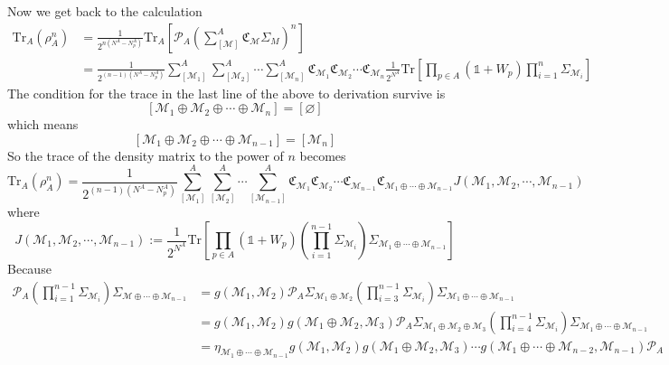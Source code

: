 \documentclass[12font]{article}
\theoremstyle{definition}
\numberwithin{equation}{section}
\newcommand{\lr}[1]{\left(  #1  \right)}
\newcommand{\lrm}[1]{\left[  #1  \right]}
\newcommand{\mrm}[1]{\mathrm{#1}}
\newcommand{\Tr}{\mrm{Tr}}
\begin{document}
Now we get back to the calculation 
\begin{align*}
\Tr_A\lr{\rho_A^n} &= \frac{1}{2^{n(N^A - N_p^A)}}\Tr_A\lrm{\mathcal{P}_A \lr{\sum_{[\mathcal{M}]}^{A}\mathfrak{C}_{\mathcal{M}}\Sigma_M}^n} \\
&= \frac{1}{2^{(n-1)(N^A - N_p^A)}} \sum_{[\mathcal{M}_1]}^{A}\sum_{[\mathcal{M}_2]}^{A} \cdots \sum_{[\mathcal{M}_n]}^{A} \mathfrak{C}_{\mathcal{M}_1}\mathfrak{C}_{\mathcal{M}_2} \cdots \mathfrak{C}_{\mathcal{M}_n}\frac{1}{2^{N^A}}\Tr\lrm{\prod_{p\in A}\lr{\mathds{1} + W_p}\prod_{i=1}^{n}\Sigma_{\mathcal{M}_i}} 
\end{align*}
The condition for the trace in the last line of the above to derivation survive is
\[
[\mathcal{M}_1\oplus\mathcal{M}_2\oplus\cdots\oplus \mathcal{M}_n] = [\varnothing]
\]
which means
\[
[\mathcal{M}_1\oplus\mathcal{M}_2\oplus\cdots\oplus \mathcal{M}_{n-1}] = [\mathcal{M}_n]
\]
So the trace of the density matrix to the power of $n$ becomes
\begin{equation}\label{rho_derive_1.e}
\Tr_A\lr{\rho_A^n} = \frac{1}{2^{(n-1)(N^A - N_p^A)}} \sum_{[\mathcal{M}_1]}^{A}\sum_{[\mathcal{M}_2]}^{A} \cdots \sum_{[\mathcal{M}_{n-1}]}^{A} \mathfrak{C}_{\mathcal{M}_1}\mathfrak{C}_{\mathcal{M}_2} \cdots \mathfrak{C}_{\mathcal{M}_{n-1}} \mathfrak{C}_{\mathcal{M}_1\oplus\cdots\oplus\mathcal{M}_{n-1}} J\lr{\mathcal{M}_1,\mathcal{M}_2,\cdots,\mathcal{M}_{n-1}}
\end{equation}
where
\[
  J\lr{\mathcal{M}_1,\mathcal{M}_2,\cdots,\mathcal{M}_{n-1}} := \frac{1}{2^{N^A}}\Tr\lrm{\prod_{p\in A}\lr{\mathds{1} + W_p} \lr{\prod_{i=1}^{n-1}\Sigma_{\mathcal{M}_i}} \Sigma_{\mathcal{M}_1\oplus\cdots\oplus\mathcal{M}_{n-1}}} 
\]
Because
\begin{align*}
  \mathcal{P}_A\lr{\prod_{i=1}^{n-1}\Sigma_{\mathcal{M}_i}} \Sigma_{\mathcal{M}\oplus\cdots\oplus\mathcal{M}_{n-1}} &= g(\mathcal{M}_1,\mathcal{M}_2)\mathcal{P}_A\Sigma_{\mathcal{M}_1\oplus\mathcal{M}_2} \lr{\prod_{i=3}^{n-1}\Sigma_{\mathcal{M}_i}} \Sigma_{\mathcal{M}_{1}\oplus\cdots\oplus\mathcal{M}_{n-1}} \\
  &= g(\mathcal{M}_1,\mathcal{M}_2) g(\mathcal{M}_1\oplus\mathcal{M}_2,\mathcal{M}_3) \mathcal{P}_A\Sigma_{\mathcal{M}_1\oplus\mathcal{M}_2\oplus\mathcal{M}_3} \lr{\prod_{i=4}^{n-1}\Sigma_{\mathcal{M}_i}} \Sigma_{\mathcal{M}_{1}\oplus\cdots\oplus\mathcal{M}_{n-1}} \\
  &= \eta_{\mathcal{M}_{1}\oplus\cdots\oplus\mathcal{M}_{n-1}} g(\mathcal{M}_1,\mathcal{M}_2) 
  g(\mathcal{M}_1\oplus\mathcal{M}_2,\mathcal{M}_3) \cdots
  g(\mathcal{M}_1\oplus\cdots \oplus \mathcal{M}_{n-2},\mathcal{M}_{n-1})
  \mathcal{P}_A
\end{align*}
\end{document}
